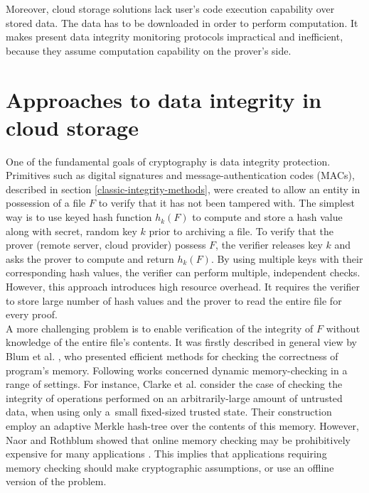 Moreover, cloud storage solutions lack user's code execution capability over
stored data. The data has to be downloaded in order to perform computation. It
makes present data integrity monitoring protocols impractical and inefficient,
because they assume computation capability on the prover's side.

\section{Approaches to data integrity in cloud storage}
\label{cloud-integrity-approaches}
One of the fundamental goals of cryptography is data integrity protection.
Primitives such as digital signatures and message-authentication codes (MACs),
described in section \ref{classic-integrity-methods}, were created to allow
an entity in possession of a file $F$ to verify that it has not been tampered
with. The simplest way is to use keyed hash function $h_{k}(F)$ to compute and
store a hash value along with secret, random key $k$ prior to archiving a file.
To verify that the prover (remote server, cloud provider) possess $F$, the
verifier releases key $k$ and asks the prover to compute and return $h_{k}(F)$.
By using multiple keys with their corresponding hash values, the verifier can
perform multiple, independent checks. However, this approach introduces high
resource overhead. It requires the verifier to store large number
of hash values and the prover to read the entire file for every proof.\\

A more challenging problem is to enable verification of the integrity of $F$
without knowledge of the entire file's contents. It was firstly described in
general view by Blum et al. \cite{memory-correctness}, who presented efficient
methods for checking the correctness of program's memory. Following works
concerned dynamic memory-checking in a range of settings. For instance, Clarke
et al. \cite{clarke} consider the case of checking the integrity of operations
performed on an arbitrarily-large amount of untrusted data, when using only 
a~small fixed-sized trusted state. Their construction employ an adaptive
Merkle hash-tree over the contents of this memory. However, Naor and Rothblum
showed that online memory checking may be prohibitively expensive for many
applications \cite{omc-complexity}. This implies that applications requiring
memory checking should make cryptographic assumptions, or use an offline
version of the problem.\\

